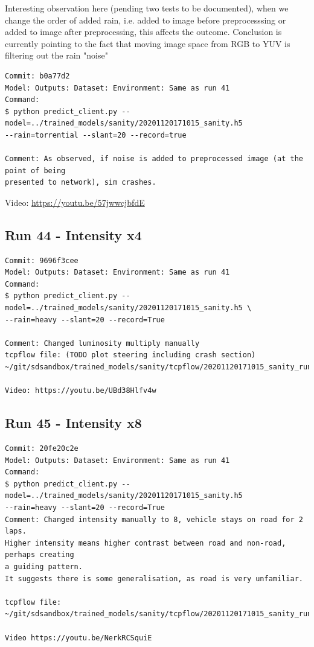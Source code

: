Interesting observation here (pending two tests to be documented), when we change the order of added rain, i.e. added to image before preprocesssing or added to image after preprocessing, this affects the outcome. Conclusion is currently pointing to the fact that moving image space from RGB to YUV is filtering out the rain "noise"

\label{app_res:43}
\begin{verbatim}
Commit: b0a77d2
Model: Outputs: Dataset: Environment: Same as run 41 
Command: 
$ python predict_client.py --model=../trained_models/sanity/20201120171015_sanity.h5
--rain=torrential --slant=20 --record=true

Comment: As observed, if noise is added to preprocessed image (at the point of being
presented to network), sim crashes.

\end{verbatim}
Video: \url{https://youtu.be/57jwwcjbfdE}


\subsection{Run 44 - Intensity x4}
\begin{verbatim}
Commit: 9696f3cee
Model: Outputs: Dataset: Environment: Same as run 41 
Command: 
$ python predict_client.py --model=../trained_models/sanity/20201120171015_sanity.h5 \
--rain=heavy --slant=20 --record=True

Comment: Changed luminosity multiply manually 
tcpflow file: (TODO plot steering including crash section)
~/git/sdsandbox/trained_models/sanity/tcpflow/20201120171015_sanity_run44.log

Video: https://youtu.be/UBd38Hlfv4w

\end{verbatim}


\subsection{Run 45 - Intensity x8}
\begin{verbatim}
Commit: 20fe20c2e
Model: Outputs: Dataset: Environment: Same as run 41 
Command: 
$ python predict_client.py --model=../trained_models/sanity/20201120171015_sanity.h5
--rain=heavy --slant=20 --record=True
Comment: Changed intensity manually to 8, vehicle stays on road for 2 laps.
Higher intensity means higher contrast between road and non-road, perhaps creating 
a guiding pattern.
It suggests there is some generalisation, as road is very unfamiliar.

tcpflow file:
~/git/sdsandbox/trained_models/sanity/tcpflow/20201120171015_sanity_run45.log

Video https://youtu.be/NerkRCSquiE
\end{verbatim}


